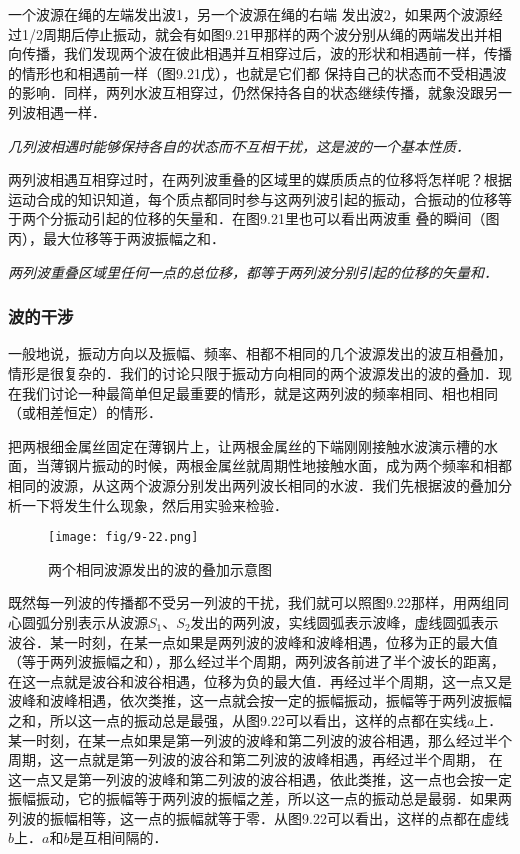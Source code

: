 一个波源在绳的左端发出波1，另一个波源在绳的右端
发出波2，如果两个波源经过1/2周期后停止振动，就会有如图9.21甲那样的两个波分别从绳的两端发出并相向传播，我们发现两个波在彼此相遇并互相穿过后，波的形状和相遇前一样，传播的情形也和相遇前一样（图9.21戊），也就是它们都
保持自己的状态而不受相遇波的影响．同样，两列水波互相穿过，仍然保持各自的状态继续传播，就象没跟另一列波相遇一样．

\textit{几列波相遇时能够保持各自的状态而不互相干扰，这是波的一个基本性质．}

两列波相遇互相穿过时，在两列波重叠的区域里的媒质质点的位移将怎样呢？根据运动合成的知识知道，每个质点都同时参与这两列波引起的振动，合振动的位移等于两个分振动引起的位移的矢量和．在图9.21里也可以看出两波重
叠的瞬间（图丙），最大位移等于两波振幅之和．

\textit{两列波重叠区域里任何一点的总位移，都等于两列波分别引起的位移的矢量和．}

\subsubsection{波的干涉} 

一般地说，振动方向以及振幅、频率、相都不相同的几个波源发出的波互相叠加，情形是很复杂的．我们的讨论只限于振动方向相同的两个波源发出的波的叠加．现在我们讨论一种最简单但足最重要的情形，就是这两列波的频率相同、相也相同（或相差恒定）的情形．

把两根细金属丝固定在薄钢片上，让两根金属丝的下端刚刚接触水波演示槽的水面，当薄钢片振动的时候，两根金属丝就周期性地接触水面，成为两个频率和相都相同的波源，从这两个波源分别发出两列波长相同的水波．我们先根据波的叠加分析一下将发生什么现象，然后用实验来检验．
\begin{figure}[htp]\centering
    \texttt{[image: fig/9-22.png]}
    \caption{两个相同波源发出的波的叠加示意图}
    \end{figure}

既然每一列波的传播都不受另一列波的干扰，我们就可以照图9.22那样，用两组同心圆弧分别表示从波源$S_1$、$S_2$发出的两列波，实线圆弧表示波峰，虚线圆弧表示波谷．某一时刻，在某一点如果是两列波的波峰和波峰相遇，位移为正的最大值（等于两列波振幅之和），那么经过半个周期，两列波各前进了半个波长的距离，在这一点就是波谷和波谷相遇，位移为负的最大值．再经过半个周期，这一点又是波峰和波峰相遇，依次类推，这一点就会按一定的振幅振动，振幅等于两列波振幅之和，所以这一点的振动总是最强，从图9.22可以看出，这样的点都在实线$a$上．某一时刻，在某一点如果是第一列波的波峰和第二列波的波谷相遇，那么经过半个周期，这一点就是第一列波的波谷和第二列波的波峰相遇，再经过半个周期，
在这一点又是第一列波的波峰和第二列波的波谷相遇，依此类推，这一点也会按一定振幅振动，它的振幅等于两列波的振幅之差，所以这一点的振动总是最弱．如果两列波的振幅相等，这一点的振幅就等于零．从图9.22可以看出，这样的点都在虚线$b$上．$a$和$b$是互相间隔的．

